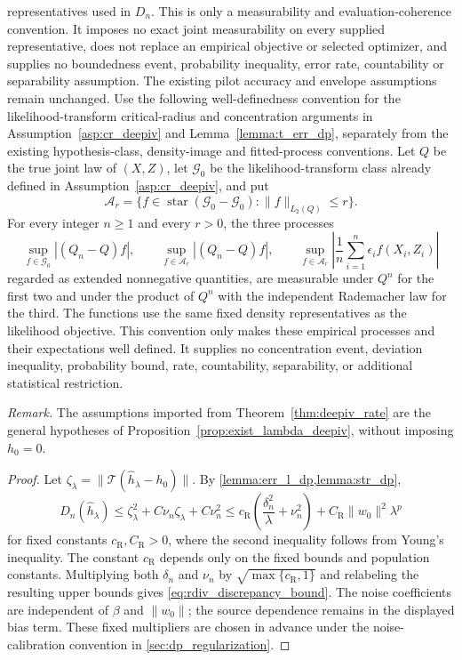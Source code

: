 \begin{corollary}
representatives used in $D_n$. This is only a measurability and evaluation-coherence convention. It imposes no exact joint measurability on every supplied representative, does not replace an empirical objective or selected optimizer, and supplies no boundedness event, probability inequality, error rate, countability or separability assumption. The existing pilot accuracy and envelope assumptions remain unchanged. Use the following well-definedness convention for the likelihood-transform critical-radius and concentration arguments in Assumption~\ref{asp:cr_deepiv} and Lemma~\ref{lemma:t_err_dp}, separately from the existing hypothesis-class, density-image and fitted-process conventions. Let $Q$ be the true joint law of $(X,Z)$, let $\mathcal G_0$ be the likelihood-transform class already defined in Assumption~\ref{asp:cr_deepiv}, and put \[ \mathcal A_r=\{f\in\operatorname{star}(\mathcal G_0-\mathcal G_0):\|f\|_{L_2(Q)}\leqslant r\}. \] For every integer $n\geqslant1$ and every $r>0$, the three processes \[ \sup_{f\in\mathcal G_0}|(Q_n-Q)f|,\qquad \sup_{f\in\mathcal A_r}|(Q_n-Q)f|,\qquad \sup_{f\in\mathcal A_r}\left|\frac1n\sum_{i=1}^n\epsilon_i f(X_i,Z_i)\right| \] regarded as extended nonnegative quantities, are measurable under $Q^n$ for the first two and under the product of $Q^n$ with the independent Rademacher law for the third. The functions use the same fixed density representatives as the likelihood objective. This convention only makes these empirical processes and their expectations well defined. It supplies no concentration event, deviation inequality, probability bound, rate, countability, separability, or additional statistical restriction.
\end{corollary}

\noindent\textit{Remark.} The assumptions imported from Theorem~\ref{thm:deepiv_rate} are the general hypotheses of Proposition~\ref{prop:exist_lambda_deepiv}, without imposing $h_0=0$.

\begin{proof}
Let $\zeta_\lambda=\|\mathcal T(\hat h_\lambda-h_0)\|$. By
\cref{lemma:err_l_dp,lemma:str_dp},
\[
D_n(\hat h_\lambda)
\leqslant \zeta_\lambda^2+C\nu_n\zeta_\lambda+C\nu_n^2
\leqslant c_{\mathrm R}
\left(\frac{\delta_n^2}{\lambda}+\nu_n^2\right)
+C_{\mathrm R}\|w_0\|^2\lambda^p
\]
for fixed constants $c_{\mathrm R},C_{\mathrm R}>0$, where the second inequality follows from Young's inequality. The constant $c_{\mathrm R}$ depends only on the fixed bounds and population constants. Multiplying both $\delta_n$ and $\nu_n$ by $\sqrt{\max\{c_{\mathrm R},1\}}$ and relabeling the resulting upper bounds gives \eqref{eq:rdiv_discrepancy_bound}. The noise coefficients are independent of $\beta$ and $\|w_0\|$; the source dependence remains in the displayed bias term. These fixed multipliers are chosen in advance under the noise-calibration convention in \cref{sec:dp_regularization}.
\end{proof}

